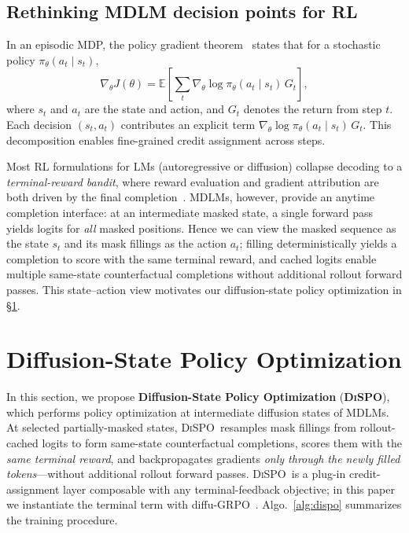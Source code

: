 \documentclass{article}
\newcommand{\method}{{\textsc{DiSPO}}}
\theoremstyle{plain}
\theoremstyle{definition}
\theoremstyle{remark}
\begin{document}
\subsection{Rethinking MDLM decision points for RL}
\label{sec:bg:pg}
In an episodic MDP, the policy gradient theorem~\citep{williams1992simple,sutton1999policy} states that for a stochastic policy $\pi_\theta(a_t\mid s_t)$,
\[
\nabla_\theta J(\theta)
=
\mathbb{E}\!\left[\sum_t \nabla_\theta \log \pi_\theta(a_t\mid s_t)\, G_t\right],
\]
where $s_t$ and $a_t$ are the state and action, and $G_t$ denotes the return from step $t$.
Each decision $(s_t,a_t)$ contributes an explicit term
$\nabla_\theta \log \pi_\theta(a_t\!\mid\! s_t)\,G_t$.
This decomposition enables fine-grained credit assignment across steps.

Most RL formulations for LMs (autoregressive or diffusion) collapse decoding to a \emph{terminal-reward bandit}, where reward evaluation and gradient attribution are both driven by the final completion~\citep{shao2024deepseekmath,zhao2025d1}.
MDLMs, however, provide an anytime completion interface: at an intermediate masked state, a single forward pass yields logits for \emph{all} masked positions.
Hence we can view {the masked sequence} as the {state} $s_t$ and {its mask fillings} as the {action} $a_t$; filling deterministically yields a completion to score with the same terminal reward, and cached logits enable multiple same-state counterfactual completions without additional rollout forward passes.
This state--action view motivates our diffusion-state policy optimization in \S\ref{sec:method}.


\section{Diffusion-State Policy Optimization}
\label{sec:method}
In this section,
we propose \textbf{{Diffusion-State Policy Optimization}} (\textbf{\method}), which performs policy optimization at intermediate diffusion states of MDLMs.
At {selected partially-masked states}, \method\ resamples {mask fillings} from rollout-cached logits to form same-state counterfactual completions, scores them with the \emph{same terminal reward}, and backpropagates gradients \emph{only through the newly filled tokens}---without additional rollout forward passes.
\method\ is a plug-in credit-assignment layer composable with any terminal-feedback objective; in this paper we instantiate the terminal term with diffu-GRPO~\citep{zhao2025d1}.
Algo.~\ref{alg:dispo} summarizes the training procedure.
\end{document}
